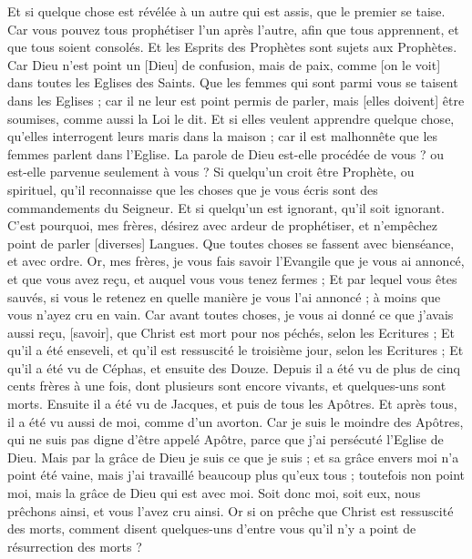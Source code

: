 \begin{multicols}{2}
Et si quelque chose est révélée à un autre qui est assis, que le premier se taise.
Car vous pouvez tous prophétiser l'un après l'autre, afin que tous apprennent, et que tous soient consolés.
Et les Esprits des Prophètes sont sujets aux Prophètes.
Car Dieu n'est point un [Dieu] de confusion, mais de paix, comme [on le voit] dans toutes les Eglises des Saints.
Que les femmes qui sont parmi vous se taisent dans les Eglises ; car il ne leur est point permis de parler, mais [elles doivent] être soumises, comme aussi la Loi le dit.
Et si elles veulent apprendre quelque chose, qu'elles interrogent leurs maris dans la maison ; car il est malhonnête que les femmes parlent dans l'Eglise.
La parole de Dieu est-elle procédée de vous ? ou est-elle parvenue seulement à vous ?
Si quelqu'un croit être Prophète, ou spirituel, qu'il reconnaisse que les choses que je vous écris sont des commandements du Seigneur.
Et si quelqu'un est ignorant, qu'il soit ignorant.
C'est pourquoi, mes frères, désirez avec ardeur de prophétiser, et n'empêchez point de parler [diverses] Langues.
Que toutes choses se fassent avec bienséance, et avec ordre.
\VerseOne{}Or, mes frères, je vous fais savoir l'Evangile que je vous ai annoncé, et que vous avez reçu, et auquel vous vous tenez fermes ;
Et par lequel vous êtes sauvés, si vous le retenez en quelle manière je vous l'ai annoncé ; à moins que vous n'ayez cru en vain.
Car avant toutes choses, je vous ai donné ce que j'avais aussi reçu, [savoir], que Christ est mort pour nos péchés, selon les Ecritures ;
Et qu'il a été enseveli, et qu'il est ressuscité le troisième jour, selon les Ecritures ;
Et qu'il a été vu de Céphas, et ensuite des Douze.
Depuis il a été vu de plus de cinq cents frères à une fois, dont plusieurs sont encore vivants, et quelques-uns sont morts.
Ensuite il a été vu de Jacques, et puis de tous les Apôtres.
Et après tous, il a été vu aussi de moi, comme d'un avorton.
Car je suis le moindre des Apôtres, qui ne suis pas digne d'être appelé Apôtre, parce que j'ai persécuté l'Eglise de Dieu.
Mais par la grâce de Dieu je suis ce que je suis ; et sa grâce envers moi n'a point été vaine, mais j'ai travaillé beaucoup plus qu'eux tous ; toutefois non point moi, mais la grâce de Dieu qui est avec moi.
Soit donc moi, soit eux, nous prêchons ainsi, et vous l'avez cru ainsi.
Or si on prêche que Christ est ressuscité des morts, comment disent quelques-uns d'entre vous qu'il n'y a point de résurrection des morts ?

\end{multicols}
